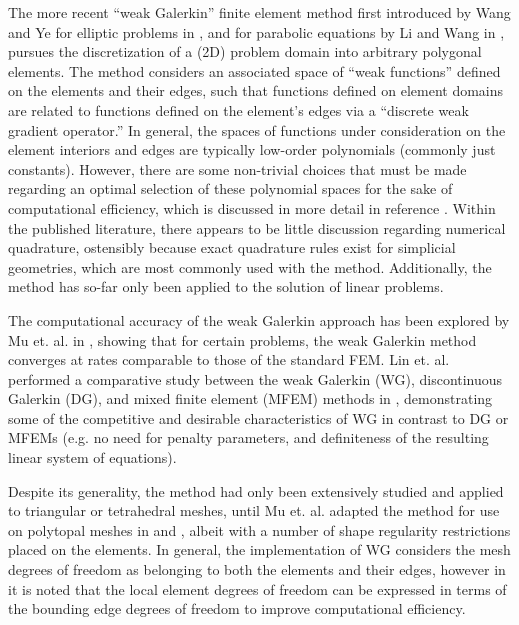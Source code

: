 		The more recent ``weak Galerkin'' finite element method first introduced by Wang and Ye for elliptic problems in \cite{Wang:13}, and for parabolic equations by Li and Wang in \cite{Li:13}, pursues the discretization of a (2D) problem domain into arbitrary polygonal elements. The method considers an associated space of ``weak functions'' defined on the elements and their edges, such that functions defined on element domains are related to functions defined on the element's edges via a ``discrete weak gradient operator.'' In general, the spaces of functions under consideration on the element interiors and edges are typically low-order polynomials (commonly just constants). However, there are some non-trivial choices that must be made regarding an optimal selection of these polynomial spaces for the sake of computational efficiency, which is discussed in more detail in reference \cite{Mu:15:1}. Within the published literature, there appears to be little discussion regarding numerical quadrature, ostensibly because exact quadrature rules exist for simplicial geometries, which are most commonly used with the method. Additionally, the method has so-far only been applied to the solution of linear problems.

	The computational accuracy of the weak Galerkin approach has been explored by Mu et. al. in \cite{Mu:13}, showing that for certain problems, the weak Galerkin method converges at rates comparable to those of the standard FEM. Lin et. al. performed a comparative study between the weak Galerkin (WG), discontinuous Galerkin (DG), and mixed finite element (MFEM) methods in \cite{Lin:15}, demonstrating some of the competitive and desirable characteristics of WG in contrast to DG or MFEMs (e.g. no need for penalty parameters, and definiteness of the resulting linear system of equations).

	Despite its generality, the method had only been extensively studied and applied to triangular or tetrahedral meshes, until Mu et. al. adapted the method for use on polytopal meshes in \cite{Mu:15:2} and \cite{Mu:15:1}, albeit with a number of shape regularity restrictions placed on the elements. In general, the implementation of WG considers the mesh degrees of freedom as belonging to both the elements and their edges, however in \cite{Mu:15:1} it is noted that the local element degrees of freedom can be expressed in terms of the bounding edge degrees of freedom to improve computational efficiency.

